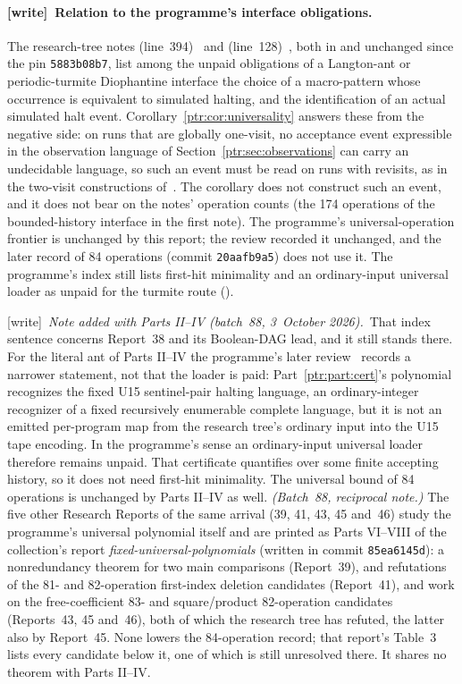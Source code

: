 \documentclass[11pt,letterpaper]{article}
\theoremstyle{definition}\newtheorem{definition}[theorem]{Definition}
\theoremstyle{remark}\newtheorem{remark}[theorem]{Remark}
\newcommand{\wtag}{\textup{[write]}}
\newcommand{\bnote}{\wtag\ \emph{Note added with Parts II--IV (batch~88, 3~October 2026).}}
\begin{document}
{\paragraph{\wtag\ Relation to the programme's interface obligations.} The
research-tree notes 
(line~394)~\cite{antnote} and 
(line~128)~\cite{togglenote}, both in
 and unchanged since the
pin \texttt{5883b08b7}, list among the unpaid obligations of a Langton-ant or
periodic-turmite Diophantine interface the choice of a macro-pattern whose
occurrence is equivalent to simulated halting, and the identification of an
actual simulated halt event. Corollary~\ref{ptr:cor:universality} answers
these from the negative side: on runs that are globally one-visit, no
acceptance event expressible in the observation language of
Section~\ref{ptr:sec:observations} can carry an undecidable language, so
such an event must be read on runs with revisits, as in the two-visit
constructions of~\cite{maldonado}. The corollary does not construct such an
event, and it does not bear on the notes' operation counts (the 174
operations of the bounded-history interface in the first note). The
programme's universal-operation frontier is unchanged by this report; the
review recorded it unchanged, and the later record of 84 operations (commit
\texttt{20aafb9a5}) does not use it. The programme's index still lists
first-hit minimality and an ordinary-input universal loader as unpaid for
the turmite route ().

\bnote\ That index sentence concerns Report~38 and its Boolean-DAG lead, and
it still stands there. For the literal ant of Parts II--IV the programme's
later review~\cite{ptr:w:rev4048} records a narrower statement, not that the
loader is paid: Part~\ref{ptr:part:cert}'s polynomial recognizes the fixed
U15 sentinel-pair halting language, an ordinary-integer recognizer of a
fixed recursively enumerable complete language, but it is not an emitted
per-program map from the research tree's ordinary input into the U15 tape
encoding. In the programme's sense an ordinary-input universal loader
therefore remains unpaid. That certificate quantifies over some finite
accepting history, so it does not need first-hit minimality. The universal
bound of 84 operations is unchanged by Parts II--IV as well.
\emph{(Batch~88, reciprocal note.)} The five other Research Reports of the
same arrival (39, 41, 43, 45 and~46) study the programme's universal
polynomial itself and are printed as Parts VI--VIII of the collection's
report \emph{fixed-universal-polynomials} (written in commit
\texttt{85ea6145d}): a nonredundancy theorem for two main comparisons
(Report~39), and refutations of the 81- and 82-operation first-index
deletion candidates (Report~41), and work on the free-coefficient 83- and
square/product 82-operation candidates (Reports~43, 45 and~46), both of
which the research tree has refuted, the latter also by Report~45. None lowers the 84-operation record; that
report's Table~3 lists every candidate below it, one of which is still
unresolved there. It shares no theorem with Parts II--IV.

}
\end{document}
